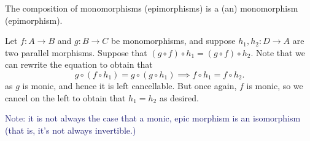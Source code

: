     \begin{lemma}\label{lemma:composition_of_epis}
        The composition of monomorphisms (epimorphisms) is a (an) monomorphism
        (epimorphism).
    \end{lemma}

    \begin{prf}
        Let $f: A \to B$ and $g: B \to C$ be
        monomorphisms, and suppose $h_1, h_2 : D \to A$ are two
        parallel morphisms. Suppose that 
        $(g \circ f) \circ h_1 = (g \circ f) \circ h_2.$
        Note that we can rewrite the equation to obtain that 
        \[
            g \circ (f \circ h_1) = g \circ (g \circ h_1) \implies f \circ h_1 = f \circ h_2. 
        \]
        as $g$ is monic, and hence it is left cancellable. 
        But once again, $f$ is monic, so we cancel on the left to
        obtain that $h_1 = h_2$
        as desired.
    \end{prf}

    

    \textcolor{MidnightBlue}{Note: it is not always the case that a
    monic, epic morphism is an isomorphism (that is, it's not always
    invertible.)}

